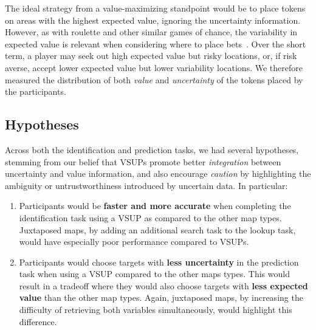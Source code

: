 The ideal strategy from a value-maximizing standpoint would be to place tokens on areas with the highest expected value, ignoring the uncertainty information. However, as with roulette and other similar games of chance, the variability in expected value is relevant when considering where to place bets~\cite{mlodinow2009drunkard}. Over the short term, a player may seek out high expected value but risky locations, or, if risk averse, accept lower expected value but lower variability locations. We therefore measured the distribution of both \emph{value} and \emph{uncertainty} of the tokens placed by the participants.




\subsection{Hypotheses}

Across both the identification and prediction tasks, we had several hypotheses, stemming from our belief that VSUPs promote better \emph{integration} between uncertainty and value information, and also encourage \emph{caution} by highlighting the ambiguity or untrustworthiness introduced by uncertain data. In particular:
\begin{enumerate}
	\item Participants would be \textbf{faster and more accurate} when completing the identification task using a VSUP as compared to the other map types. Juxtaposed maps, by adding an additional search task to the lookup task, would have especially poor performance compared to VSUPs.
	\item Participants would choose targets with \textbf{less uncertainty} in the prediction task when using a VSUP compared to the other maps types. This would result in a tradeoff where they would also choose targets with \textbf{less expected value} than the other map types. Again, juxtaposed maps, by increasing the difficulty of retrieving both variables simultaneously, would highlight this difference.
\end{enumerate}

